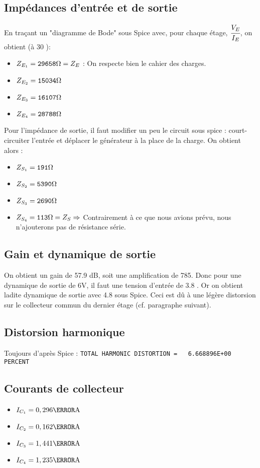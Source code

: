   \subsection{Impédances d'entrée et de sortie}
    En traçant un "diagramme de Bode" sous Spice avec, pour chaque étage, $\cfrac{V_E}{I_E}$, on obtient (à 30 \kilo\hertz):
    \begin{itemize}
     \item $Z_{E_1} = \verb|29658|\ohm = Z_E$ : On respecte bien le cahier des charges.
     \item $Z_{E_2} = \verb|15034|\ohm$
     \item $Z_{E_3} = \verb|16107|\ohm$
     \item $Z_{E_4} = \verb|28788|\ohm$
    \end{itemize}

    Pour l'impédance de sortie, il faut modifier un peu le circuit sous spice : court-circuiter l'entrée et déplacer le générateur à la place de la charge. On obtient alors :
    \begin{itemize}
     \item $Z_{S_1} = \verb|191|\ohm$
     \item $Z_{S_2} = \verb|5390|\ohm$
     \item $Z_{S_3} = \verb|2690|\ohm$
     \item $Z_{S_4} = \verb|113|\ohm = Z_S \Rightarrow$ Contrairement à ce que nous avions prévu, nous n'ajouterons pas de résistance série.
    \end{itemize}

   \subsection{Gain et dynamique de sortie}
    On obtient un gain de 57.9 dB, soit une amplification de 785.
    Donc pour une dynamique de sortie de 6V, il faut une tension d'entrée de 3.8 \milli\volt.
    Or on obtient ladite dynamique de sortie avec 4.8 \milli\volt  sous Spice. Ceci est dû à une légère distorsion sur le collecteur commun du dernier étage (cf. paragraphe suivant).
   
   \subsection{Distorsion harmonique}
    Toujours d'après Spice : \verb|TOTAL HARMONIC DISTORTION =   6.668896E+00 PERCENT|

   \subsection{Courants de collecteur}
    \begin{itemize}
     \item $I_{C_1} = 0,296 \milli\ampere$
     \item $I_{C_2} = 0,162 \milli\ampere$
     \item $I_{C_3} = 1,441 \milli\ampere$
     \item $I_{C_4} = 1,235 \milli\ampere$
    \end{itemize}

